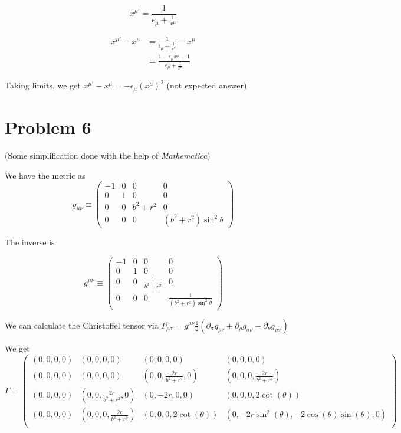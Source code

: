 \documentclass[12pt]{article}
\begin{document}
$$x^{\mu'}=\frac1{\epsilon_\mu + \frac1{x^\mu}}$$

\begin{align*}x^{\mu'}-x^\mu&=\frac1{\epsilon_\mu + \frac1{x^\mu}} - x^\mu\\
&=\frac{1-\epsilon_\mu x^\mu -1}{\epsilon_\mu + \frac1{x^\mu}}
\end{align*}

Taking limits, we get $x^{\mu'}-x^\mu=-\epsilon_\mu(x^\mu)^2$ (not expected answer)

\section*{Problem 6}

(Some simplification done with the help of {\em Mathematica})


We have the metric as $$g_{\mu\nu}\equiv\begin{pmatrix}
-1 &0&0&0\\
0&1&0&0\\
0&0&b^2+r^2&0\\
0&0&0&(b^2+r^2)\sin^2\theta
\end{pmatrix}$$

The inverse is 

$$g^{\mu\nu}\equiv\begin{pmatrix}
-1 &0&0&0\\
0&1&0&0\\
0&0&\frac1{b^2+r^2}&0\\
0&0&0&\frac1{(b^2+r^2)\sin^2\theta}
\end{pmatrix}$$

We can calculate the Christoffel tensor via $\Gamma^\mu_{\rho\sigma}=g^{\mu\nu}\frac12(\partial_\sigma g_{\rho\nu}+\partial_\rho g_{\sigma\nu}-\partial_\nu g_{\rho\sigma})$

We get $$\Gamma = \left( \begin{array}{cccc}  (0,0,0,0) & (0,0,0,0) & (0,0,0,0) & (0,0,0,0) \\  (0,0,0,0) & (0,0,0,0) & \left(0,0,\frac{2 r}{b^2+r^2},0\right) & \left(0,0,0,\frac{2 r}{b^2+r^2}\right) \\  (0,0,0,0) & \left(0,0,\frac{2 r}{b^2+r^2},0\right) & (0,-2 r,0,0) & (0,0,0,2 \cot (\theta )) \\  (0,0,0,0) & \left(0,0,0,\frac{2 r}{b^2+r^2}\right) & (0,0,0,2 \cot (\theta )) & \left(0,-2 r \sin ^2(\theta ),-2 \cos (\theta ) \sin (\theta ),0\right) \\ \end{array} \right)$$
\end{document}
